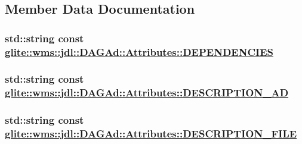 \subsection{Member Data Documentation}
\hypertarget{structglite_1_1wms_1_1jdl_1_1DAGAd_1_1Attributes_s2}{
\subsubsection[DEPENDENCIES]{\setlength{\rightskip}{0pt plus 5cm}std::string const \hyperlink{structglite_1_1wms_1_1jdl_1_1DAGAd_1_1Attributes_s2}{glite::wms::jdl::DAGAd::Attributes::DEPENDENCIES}}}
\label{structglite_1_1wms_1_1jdl_1_1DAGAd_1_1Attributes_s2}


\hypertarget{structglite_1_1wms_1_1jdl_1_1DAGAd_1_1Attributes_s7}{
\subsubsection[DESCRIPTION\_\-AD]{\setlength{\rightskip}{0pt plus 5cm}std::string const \hyperlink{structglite_1_1wms_1_1jdl_1_1DAGAd_1_1Attributes_s7}{glite::wms::jdl::DAGAd::Attributes::DESCRIPTION\_\-AD}}}
\label{structglite_1_1wms_1_1jdl_1_1DAGAd_1_1Attributes_s7}


\hypertarget{structglite_1_1wms_1_1jdl_1_1DAGAd_1_1Attributes_s6}{
\subsubsection[DESCRIPTION\_\-FILE]{\setlength{\rightskip}{0pt plus 5cm}std::string const \hyperlink{structglite_1_1wms_1_1jdl_1_1DAGAd_1_1Attributes_s6}{glite::wms::jdl::DAGAd::Attributes::DESCRIPTION\_\-FILE}}}
\label{structglite_1_1wms_1_1jdl_1_1DAGAd_1_1Attributes_s6}



